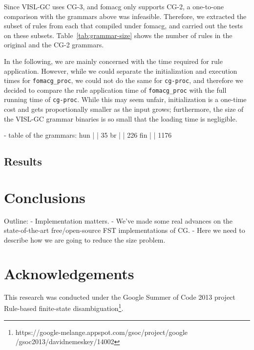 \documentclass{article}
\begin{document}
Since VISL-GC uses CG-3, and fomacg only supports CG-2, a one-to-one comparison
with the grammars above was infeasible. Therefore, we extracted the subset of
rules from each that compiled under fomacg, and carried out the tests on these
subsets. Table~\ref{tab:grammar-size} shows the number of rules in the original
and the CG-2 grammars.

In the following, we are mainly concerned with the time required for rule
application. However, while we could separate the initialization and execution
times for \texttt{fomacg\_proc}, we could not do the same for \texttt{cg-proc},
and therefore we decided to compare the rule application time of
\texttt{fomacg\_proc} with the full running time of \texttt{cg-proc}.
While this may seem unfair, initialization is a one-time cost and gets
proportionally smaller as the input grows; furthermore, the size of the VISL-GC
grammar binaries is so small that the loading time is negligible.

- table of the grammars: %
  hun | | 35 
  br  | | 226
  fin | | 1176

\subsection{Results}

\section{Conclusions}
\label{sec:conclusion}
Outline:
- Implementation matters.
- We've made some real advances on the state-of-the-art free/open-source
  FST implementations of CG. 
- Here we need to describe how we are going to reduce the size problem.


\section*{Acknowledgements}
This research was conducted under the Google Summer of Code 2013 project
Rule-based finite-state disambiguation\footnote{https://google-melange.appspot.com/gsoc/project/google
/gsoc2013/davidnemeskey/14002}.

\cite{Karlsson:1990} %
\cite{Hulden:2011} %
\cite{Peltonen:2011} %
\cite{Tapanainen:1996} %



\end{document}

